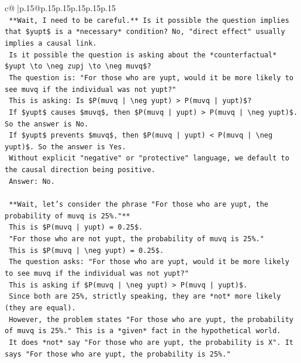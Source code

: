 \documentclass{article}
\begin{document}
{\begin{supertabular}{c@{$\;$}|p{.15\linewidth}@{}p{.15\linewidth}p{.15\linewidth}p{.15\linewidth}p{.15\linewidth}p{.15\linewidth}}
{{{\\ 
\texttt{    **Wait, I need to be careful.** Is it possible the question implies that \$yupt\$ is a *necessary* condition? No, "direct effect" usually implies a causal link.} \\
\texttt{    Is it possible the question is asking about the *counterfactual* \$yupt \textbackslash{}to \textbackslash{}neg zupj \textbackslash{}to \textbackslash{}neg muvq\$?} \\
\texttt{    The question is: "For those who are yupt, would it be more likely to see muvq if the individual was not yupt?"} \\
\texttt{    This is asking: Is \$P(muvq | \textbackslash{}neg yupt) > P(muvq | yupt)\$?} \\
\texttt{    If \$yupt\$ causes \$muvq\$, then \$P(muvq | yupt) > P(muvq | \textbackslash{}neg yupt)\$. So the answer is No.} \\
\texttt{    If \$yupt\$ prevents \$muvq\$, then \$P(muvq | yupt) < P(muvq | \textbackslash{}neg yupt)\$. So the answer is Yes.} \\
\texttt{    Without explicit "negative" or "protective" language, we default to the causal direction being positive.} \\
\texttt{    Answer: No.} \\
\\ 
\texttt{    **Wait, let's consider the phrase "For those who are yupt, the probability of muvq is 25\%."**} \\
\texttt{    This is \$P(muvq | yupt) = 0.25\$.} \\
\texttt{    "For those who are not yupt, the probability of muvq is 25\%."} \\
\texttt{    This is \$P(muvq | \textbackslash{}neg yupt) = 0.25\$.} \\
\texttt{    The question asks: "For those who are yupt, would it be more likely to see muvq if the individual was not yupt?"} \\
\texttt{    This is asking if \$P(muvq | \textbackslash{}neg yupt) > P(muvq | yupt)\$.} \\
\texttt{    Since both are 25\%, strictly speaking, they are *not* more likely (they are equal).} \\
\texttt{    However, the problem states "For those who are yupt, the probability of muvq is 25\%." This is a *given* fact in the hypothetical world.} \\
\texttt{    It does *not* say "For those who are yupt, the probability is X". It says "For those who are yupt, the probability is 25\%."} \\
}}}
\end{supertabular}}
\end{document}
